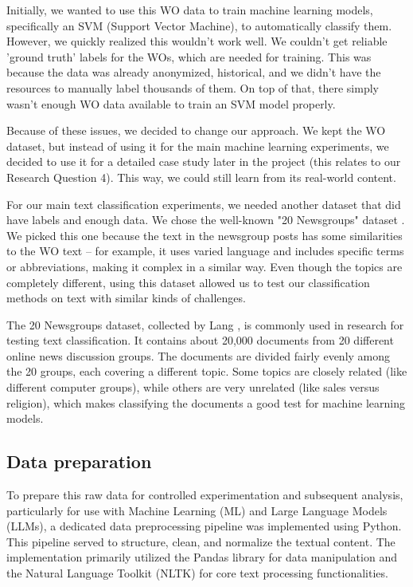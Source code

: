 Initially, we wanted to use this WO data to train machine learning models, specifically an SVM (Support Vector Machine), to automatically classify them. However, we quickly realized this wouldn't work well. We couldn't get reliable 'ground truth' labels for the WOs, which are needed for training. This was because the data was already anonymized, historical, and we didn't have the resources to manually label thousands of them. On top of that, there simply wasn't enough WO data available to train an SVM model properly.

Because of these issues, we decided to change our approach. We kept the WO dataset, but instead of using it for the main machine learning experiments, we decided to use it for a detailed case study later in the project (this relates to our Research Question 4). This way, we could still learn from its real-world content.

For our main text classification experiments, we needed another dataset that did have labels and enough data. We chose the well-known "20 Newsgroups" dataset \cite{Lang95}. We picked this one because the text in the newsgroup posts has some similarities to the WO text – for example, it uses varied language and includes specific terms or abbreviations, making it complex in a similar way. Even though the topics are completely different, using this dataset allowed us to test our classification methods on text with similar kinds of challenges.

The 20 Newsgroups dataset, collected by Lang \cite{Lang95}, is commonly used in research for testing text classification. It contains about 20,000 documents from 20 different online news discussion groups. The documents are divided fairly evenly among the 20 groups, each covering a different topic. Some topics are closely related (like different computer groups), while others are very unrelated (like sales versus religion), which makes classifying the documents a good test for machine learning models.

\subsection{Data preparation}
To prepare this raw data for controlled experimentation and subsequent analysis, particularly for use with Machine Learning (ML) and Large Language Models (LLMs), a dedicated data preprocessing pipeline was implemented using Python. This pipeline served to structure, clean, and normalize the textual content. The implementation primarily utilized the Pandas library for data manipulation and the Natural Language Toolkit (NLTK) \cite{bird2009nlp} for core text processing functionalities.

